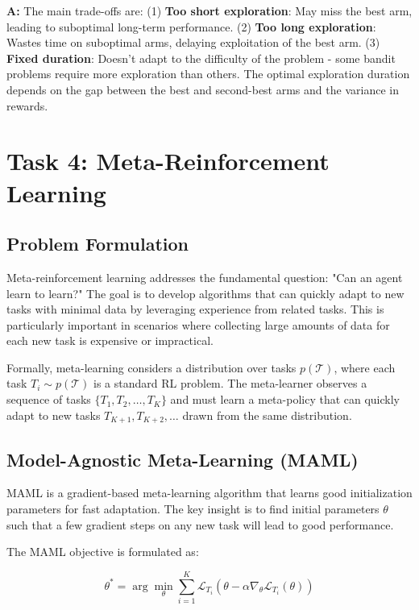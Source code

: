 \documentclass[12pt]{article}
\begin{document}
{{{\textbf{A:} The main trade-offs are: (1) \textbf{Too short exploration}: May miss the best arm, leading to suboptimal long-term performance. (2) \textbf{Too long exploration}: Wastes time on suboptimal arms, delaying exploitation of the best arm. (3) \textbf{Fixed duration}: Doesn't adapt to the difficulty of the problem - some bandit problems require more exploration than others. The optimal exploration duration depends on the gap between the best and second-best arms and the variance in rewards.

\section{Task 4: Meta-Reinforcement Learning}

\subsection{Problem Formulation}

Meta-reinforcement learning addresses the fundamental question: "Can an agent learn to learn?" The goal is to develop algorithms that can quickly adapt to new tasks with minimal data by leveraging experience from related tasks. This is particularly important in scenarios where collecting large amounts of data for each new task is expensive or impractical.

Formally, meta-learning considers a distribution over tasks $p(\mathcal{T})$, where each task $T_i \sim p(\mathcal{T})$ is a standard RL problem. The meta-learner observes a sequence of tasks $\{T_1, T_2, \ldots, T_K\}$ and must learn a meta-policy that can quickly adapt to new tasks $T_{K+1}, T_{K+2}, \ldots$ drawn from the same distribution.

\subsection{Model-Agnostic Meta-Learning (MAML)}

MAML is a gradient-based meta-learning algorithm that learns good initialization parameters for fast adaptation. The key insight is to find initial parameters $\theta$ such that a few gradient steps on any new task will lead to good performance.

The MAML objective is formulated as:

\begin{equation}
\theta^* = \arg\min_\theta \sum_{i=1}^K \mathcal{L}_{T_i}(\theta - \alpha \nabla_\theta \mathcal{L}_{T_i}(\theta))
\end{equation}

}}}
\end{document}
